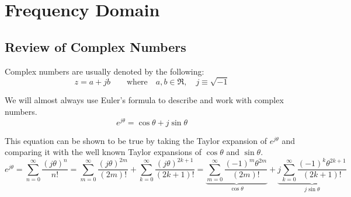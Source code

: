 \documentclass[a4paper]{article}
\numberwithin{equation}{section}
\begin{document}
\section{Frequency Domain}


\subsection{Review of Complex Numbers}
Complex numbers are usually denoted by the following:
\begin{equation}
z = a+jb \qquad \text{where} \quad a, b \in \Re, \quad j \equiv \sqrt{-1}
\end{equation}

We will almost always use Euler's formula to describe and work with complex numbers.
\begin{equation}
\boxed{e^{j \theta} = \cos{\theta}+j\sin{\theta}}
\end{equation}

This equation can be shown to be true by taking the Taylor expansion of $e^{j\theta}$ and comparing it with the well known Taylor expansions of $\cos{\theta}$ and $\sin{\theta}$. 
\begin{equation}
e^{j\theta} = \sum_{n=0}^{\infty} \frac{(j\theta)^n}{n!} = \sum_{m=0}^{\infty} \frac{(j\theta)^{2m}}{(2m)!}+\sum_{k=0}^{\infty} \frac{(j\theta)^{2k+1}}{(2k+1)!}
=\underbrace{ \sum_{m=0}^{\infty} \frac{(-1)^m\theta^{2m}}{(2m)!}}_{\cos{\theta}}+\underbrace{j\sum_{k=0}^{\infty} \frac{(-1)^{k}\theta^{2k+1}}{(2k+1)!}}_{j\sin{\theta}}
\end{equation}
\end{document}
